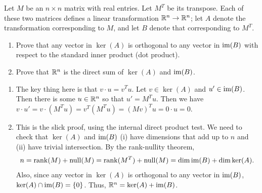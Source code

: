 \begin{question}[subtitle = August 2020 Problem 2,ID=Aug20_2]
Let $M$ be an $n \times n$ matrix with real entries. Let $M^T$ be its transpose. Each of these two matrices defines a linear transformation $\mathbb{R}^n \to \mathbb{R}^n$; let $A$ denote the transformation corresponding to $M$, and let $B$ denote that corresponding to $M^T$.
\begin{enumerate}
    \item Prove that any vector in $\ker(A)$ is orthogonal to any vector in $\operatorname{im}(B)$ with respect to the standard inner product (dot product).
    \item Prove that $\mathbb{R}^n$ is the direct sum of $\ker(A)$ and $\operatorname{im}(B)$.
\end{enumerate}
\end{question}
\begin{solution}
\begin{enumerate}
    \item The key thing here is that $v \cdot u = v^T u$. Let $v \in \ker(A)$ and $u' \in \operatorname{im}(B)$. Then there is some $u \in \mathbb{R}^n$ so that $u' = M^T u$. Then we have $v \cdot u' = v \cdot (M^T u) = v^T (M^T u) = (Mv)^T u = 0 \cdot u = 0$.
    \item This is the slick proof, using the internal direct product test. We need to check that $\ker(A)$ and $\operatorname{im}(B)$ (i) have dimensions that add up to $n$ and (ii) have trivial intersection. By the rank-nullity theorem,
    \[n = \operatorname{rank}(M) + \operatorname{null}(M) = \operatorname{rank}(M^T) + \operatorname{null}(M) = \dim \operatorname{im}(B) + \dim \ker(A).\]
    Also, since any vector in $\ker(A)$ is orthogonal to any vector in $\operatorname{im}(B)$, $\ker(A) \cap \operatorname{im}(B) = \{0\}$. Thus, $\mathbb{R}^n = \ker(A) + \operatorname{im}(B)$.
\end{enumerate}
\end{solution}

